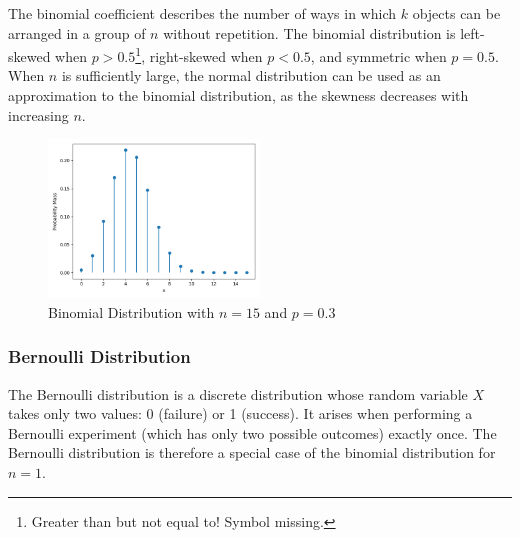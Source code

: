 
The binomial coefficient describes the number of ways in which $k$ objects can be arranged in a group of $n$ without repetition. The binomial distribution is left-skewed when $p > 0.5$\footnote{Greater than but not equal to! Symbol missing.}, right-skewed when $p < 0.5$, and symmetric when $p = 0.5$. When $n$ is sufficiently large, the normal distribution can be used as an approximation to the binomial distribution, as the skewness decreases with increasing $n$.

\begin{figure}[h]
    \centering
    \includegraphics[width=0.5\textwidth]{../images/plot_binomial_distribution.png}
    \caption{Binomial Distribution with $n=15$ and $p=0.3$}
    \label{fig:binomial_distribution}
\end{figure}

\subsubsection{Bernoulli Distribution}\label{Bernoulli}
The Bernoulli distribution is a discrete distribution whose random variable $X$ takes only two values: 0 (failure) or 1 (success). It arises when performing a Bernoulli experiment (which has only two possible outcomes) exactly once. The Bernoulli distribution is therefore a special case of the binomial distribution for $n = 1$.

